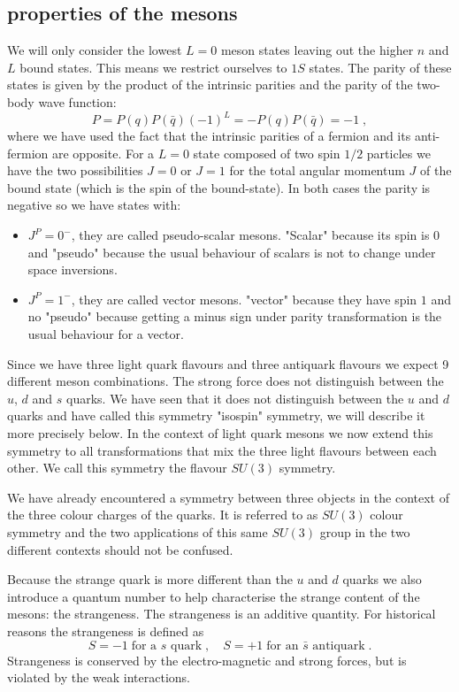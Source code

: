 \documentclass[12pt]{article}
\begin{document}
\subsection{properties of the mesons} 
We will only consider the lowest $L=0$ meson states leaving out the higher $n$ and $L$ bound states. This means we restrict ourselves to $1S$ states. The parity of these states is given by the product of the intrinsic parities and the parity of the two-body wave function:
\[P=P(q)P(\bar q)(-1)^L=-P(q)P(\bar q)=-1\;,\] 
where we have used the fact that the intrinsic parities of a fermion and its anti-fermion are opposite. For a $L=0$ state composed of two spin $1/2$ particles we have the two possibilities $J=0$ or $J=1$ for the total angular momentum $J$ of the bound state (which is the spin of the bound-state). In both cases the parity is negative so we have states with:
	\begin{itemize}
	\item $J^P=0^-$, they are called pseudo-scalar mesons. "Scalar" because its spin is $0$ and "pseudo" because the usual behaviour of scalars is not to change under space inversions.
	\item $J^P=1^-$, they are called vector mesons. "vector" because they have spin $1$ and no "pseudo" because getting a minus sign under parity transformation is the usual behaviour for a vector.
	\end{itemize}
Since we have three light quark flavours and three antiquark flavours we expect 9 different meson combinations. The strong force does not distinguish between the $u$, $d$ and $s$ quarks. We have seen that it does not distinguish between the $u$  and $d$ quarks and have called this symmetry "isospin" symmetry, we will describe it more precisely below. In the context of light quark mesons we now extend this symmetry to all transformations that mix the three light flavours between each other. We call this symmetry the flavour $SU(3)$ symmetry. 

We have already encountered a symmetry between three objects in the context of the three colour charges of the quarks. It is referred to as $SU(3)$ colour symmetry and the two applications of this same $SU(3)$ group in the two different contexts should not be confused.

Because the strange quark is more different than the $u$ and $d$ quarks we also introduce a quantum number to help characterise the strange content of the mesons: the strangeness. The strangeness is an additive quantity. For historical reasons the strangeness is defined as 
\[S=-1\; \mbox{for a $s$ quark}\;,\quad S=+1 \;\mbox{for an $\bar s$ antiquark}\;.\]   
Strangeness is conserved by the electro-magnetic and strong forces, but is violated by the weak interactions. 
\end{document}
